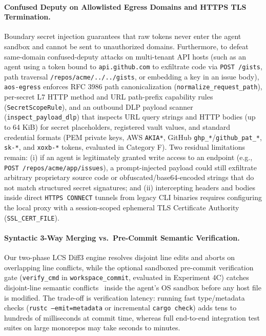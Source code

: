 \documentclass[acmsmall,screen,review]{acmart}
\begin{document}
\paragraph{Confused Deputy on Allowlisted Egress Domains and HTTPS TLS Termination.} Boundary secret injection guarantees that raw tokens never enter the agent sandbox and cannot be sent to unauthorized domains. Furthermore, to defeat same-domain confused-deputy attacks on multi-tenant API hosts (such as an agent using a token bound to \texttt{api.github.com} to exfiltrate code via \texttt{POST /gists}, path traversal \texttt{/repos/acme/../../gists}, or embedding a key in an issue body), \texttt{aos-egress} enforces RFC 3986 path canonicalization (\texttt{normalize\_request\_path}), per-secret L7 HTTP method and URL path-prefix capability rules (\texttt{SecretScopeRule}), and an outbound DLP payload scanner (\texttt{inspect\_payload\_dlp}) that inspects URL query strings and HTTP bodies (up to 64 KiB) for secret placeholders, registered vault values, and standard credential formats (PEM private keys, AWS \texttt{AKIA*}, GitHub \texttt{ghp\_*}/\texttt{github\_pat\_*}, \texttt{sk-*}, and \texttt{xoxb-*} tokens, evaluated in Category F). Two residual limitations remain: (i) if an agent is legitimately granted write access to an endpoint (e.g., \texttt{POST /repos/acme/app/issues}), a prompt-injected payload could still exfiltrate arbitrary proprietary source code or obfuscated/base64-encoded strings that do not match structured secret signatures; and (ii) intercepting headers and bodies inside direct \texttt{HTTPS CONNECT} tunnels from legacy CLI binaries requires configuring the local proxy with a session-scoped ephemeral TLS Certificate Authority (\texttt{SSL\_CERT\_FILE}).

\paragraph{Syntactic 3-Way Merging vs.\ Pre-Commit Semantic Verification.} Our two-phase LCS Diff3 engine resolves disjoint line edits and aborts on overlapping line conflicts, while the optional sandboxed pre-commit verification gate (\texttt{verify\_cmd} in \texttt{workspace\_commit}, evaluated in Experiment 4C) catches disjoint-line semantic conflicts~\cite{apel2011semistructured} inside the agent's OS sandbox before any host file is modified. The trade-off is verification latency: running fast type/metadata checks (\texttt{rustc --emit=metadata} or incremental \texttt{cargo check}) adds tens to hundreds of milliseconds at commit time, whereas full end-to-end integration test suites on large monorepos may take seconds to minutes.
\end{document}
